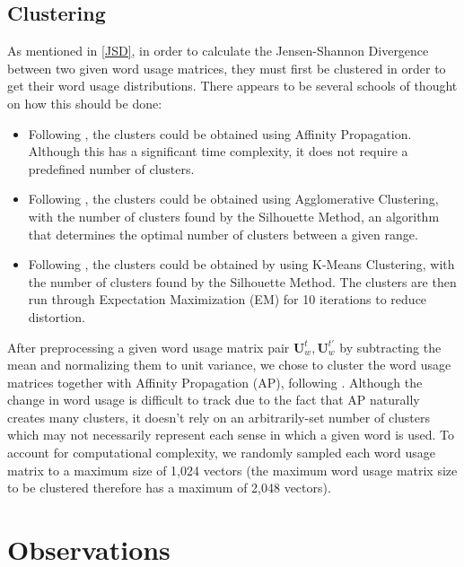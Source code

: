 \documentclass[10pt, a4paper]{article}
\begin{document}
\subsection{Clustering}
\label{clustering}
As mentioned in \ref{JSD}, in order to calculate the Jensen-Shannon Divergence between two given word usage matrices, they must first be clustered in order to get their word usage distributions. There appears to be several schools of thought on how this should be done:
\begin{itemize}
    \item{Following , the clusters could be obtained using Affinity Propagation. Although this has a significant time complexity, it does not require a predefined number of clusters.}
    \item{Following , the clusters could be obtained using Agglomerative Clustering, with the number of clusters found by the Silhouette Method\cite{silhouette}, an algorithm that determines the optimal number of clusters between a given range.}
    \item{Following , the clusters could be obtained by using K-Means Clustering, with the number of clusters found by the Silhouette Method. The clusters are then run through Expectation Maximization (EM) for 10 iterations to reduce distortion.}
\end{itemize}

After preprocessing a given word usage matrix pair $\textbf{U}^{t}_w, \textbf{U}^{t'}_w$ by subtracting the mean and normalizing them to unit variance, we chose to cluster the word usage matrices together with Affinity Propagation (AP), following \cite{Martinc2020,Kutuzov2020}. Although the change in word usage is difficult to track due to the fact that AP naturally creates many clusters, it doesn't rely on an arbitrarily-set number of clusters which may not necessarily represent each sense in which a given word is used. To account for computational complexity, we randomly sampled each word usage matrix to a maximum size of 1,024 vectors (the maximum word usage matrix size to be clustered therefore has a maximum of 2,048 vectors).

\section{Observations}
\end{document}
